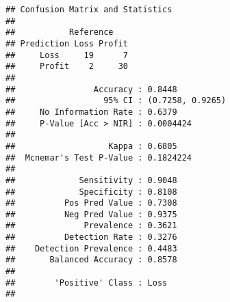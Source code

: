 \documentclass[]{article}
\newenvironment{Shaded}{\begin{snugshade}}{\end{snugshade}}
\newcommand{\KeywordTok}[1]{\textcolor[rgb]{0.13,0.29,0.53}{\textbf{#1}}}
\newcommand{\DataTypeTok}[1]{\textcolor[rgb]{0.13,0.29,0.53}{#1}}
\newcommand{\FloatTok}[1]{\textcolor[rgb]{0.00,0.00,0.81}{#1}}
\newcommand{\StringTok}[1]{\textcolor[rgb]{0.31,0.60,0.02}{#1}}
\newcommand{\CommentTok}[1]{\textcolor[rgb]{0.56,0.35,0.01}{\textit{#1}}}
\newcommand{\OperatorTok}[1]{\textcolor[rgb]{0.81,0.36,0.00}{\textbf{#1}}}
\newcommand{\NormalTok}[1]{#1}
\begin{document}
\begin{Shaded}
\end{Shaded}

\begin{verbatim}
## Confusion Matrix and Statistics
## 
##           Reference
## Prediction Loss Profit
##     Loss     19      7
##     Profit    2     30
##                                           
##                Accuracy : 0.8448          
##                  95% CI : (0.7258, 0.9265)
##     No Information Rate : 0.6379          
##     P-Value [Acc > NIR] : 0.0004424       
##                                           
##                   Kappa : 0.6805          
##  Mcnemar's Test P-Value : 0.1824224       
##                                           
##             Sensitivity : 0.9048          
##             Specificity : 0.8108          
##          Pos Pred Value : 0.7308          
##          Neg Pred Value : 0.9375          
##              Prevalence : 0.3621          
##          Detection Rate : 0.3276          
##    Detection Prevalence : 0.4483          
##       Balanced Accuracy : 0.8578          
##                                           
##        'Positive' Class : Loss            
## 
\end{verbatim}
\end{document}
